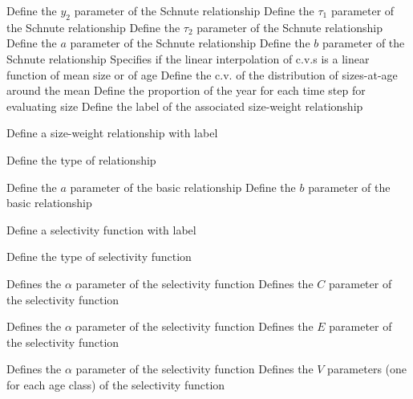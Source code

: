  {Define the $y_2$ parameter of the Schnute relationship}
 {Define the $\tau_1$ parameter of the Schnute relationship}
 {Define the $\tau_2$ parameter of the Schnute relationship}
 {Define the $a$ parameter of the Schnute relationship}
 {Define the $b$ parameter of the Schnute relationship}
 {Specifies if the linear interpolation of c.v.s is a linear function of mean size or of age}
 {Define the c.v. of the distribution of sizes-at-age around the mean}
 {Define the proportion of the year for each time step for evaluating size}
 {Define the label of the associated size-weight relationship}
\par{} {Define a size-weight relationship with label}\par
{} {Define the type of relationship}
\par\textbf{}\par
\par\textbf{}\par
{} {Define the $a$ parameter of the basic relationship}
 {Define the $b$ parameter of the basic relationship}
\par{} {Define a selectivity function with label}\par
{} {Define the type of selectivity function}
\par\textbf{}\par
{} {Defines the $\alpha$ parameter of the selectivity function}
 {Defines the $C$ parameter of the selectivity function}
\par\textbf{}\par
{} {Defines the $\alpha$ parameter of the selectivity function}
 {Defines the $E$ parameter of the selectivity function}
\par\textbf{}\par
{} {Defines the $\alpha$ parameter of the selectivity function}
 {Defines the $V$ parameters (one for each age class) of the selectivity function}
\par\textbf{}\par
